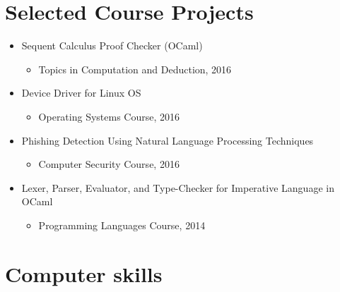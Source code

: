 \documentclass[11pt,a4paper,sans]{moderncv}        %
\begin{document}
\section{Selected Course Projects}
\begin{itemize}
\item Sequent Calculus Proof Checker (OCaml)
    \begin{itemize}
    \item Topics in Computation and Deduction, 2016
    \end{itemize}

\item Device Driver for Linux OS
    \begin{itemize}
    \item Operating Systems Course, 2016
    \end{itemize}

\item Phishing Detection Using Natural Language Processing Techniques
    \begin{itemize}
    \item Computer Security Course, 2016
    \end{itemize}
    
\item Lexer, Parser, Evaluator, and Type-Checker for Imperative Language in OCaml
    \begin{itemize}
    \item Programming Languages Course, 2014
    \end{itemize}



\end{itemize}

\section{Computer skills}

%
\end{document}
